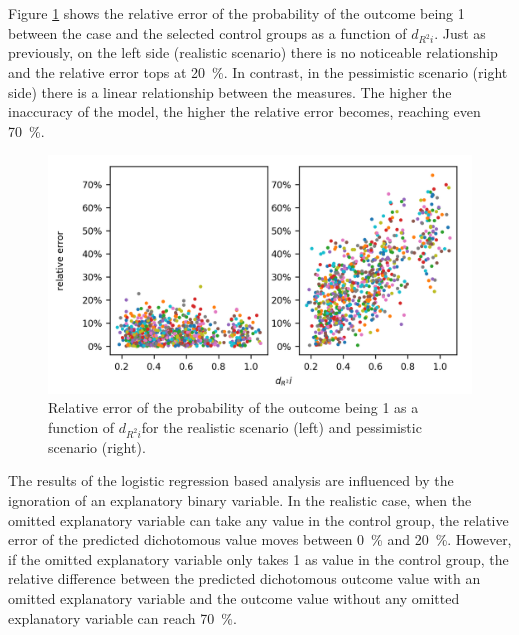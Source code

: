		Figure \ref{fig:missing_relative_error} shows the relative error of the probability of the outcome being 1 between the case and the selected control groups as a function of $d_{R^{2}i}$. Just as previously, on the left side (realistic scenario) there is no noticeable relationship and the relative error tops at \SI{20}{\percent}. In contrast, in the pessimistic scenario (right side) there is a linear relationship between the measures. The higher the inaccuracy of the model, the higher the relative error becomes, reaching even \SI{70}{\percent}.
										
		\begin{figure}[h!]
			\centering
			\captionsetup{justification=centering}
			\includegraphics[width=\textwidth]{assets/figures/control_group_selection/missing/relative_error.png}
			\caption{Relative error of the probability of the outcome being 1 as a function of $d_{R^{2}i}$for the realistic scenario (left) and pessimistic scenario (right). %
			}
			\label{fig:missing_relative_error}
		\end{figure}
										
		The results of the logistic regression based analysis are influenced by the ignoration of an explanatory binary variable. In the realistic case, when the omitted explanatory variable can take any value in the control group, the relative error of the predicted dichotomous value moves between \SI{0}{\percent} and \SI{20}{\percent}. However, if the omitted explanatory variable only takes 1 as value in the control group, the relative difference between the predicted dichotomous outcome value with an omitted explanatory variable and the outcome value without any omitted explanatory variable can reach \SI{70}{\percent}.
		  
